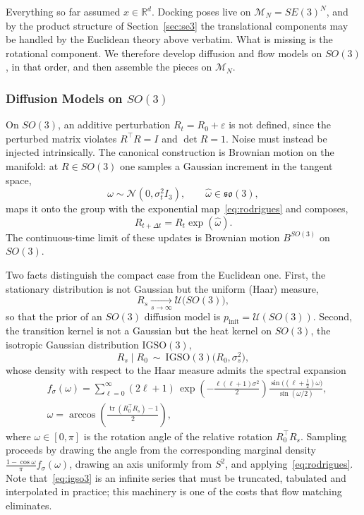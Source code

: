 \documentclass[a4paper,12pt]{article}
\theoremstyle{remark}
\DeclareMathOperator{\tr}{tr}
\begin{document}
Everything so far assumed $x\in\mathbb R^d$. Docking poses live on
$\mathcal M_N=SE(3)^N$, and by the product structure of Section~\ref{sec:se3} the
translational components may be handled by the Euclidean theory above verbatim. What is
missing is the rotational component. We therefore develop diffusion and flow models on
$SO(3)$, in that order, and then assemble the pieces on $\mathcal M_N$.

\subsubsection{Diffusion Models on $SO(3)$}
\label{sec:diff-so3}

On $SO(3)$, an additive perturbation $R_t=R_0+\varepsilon$ is not defined, since the
perturbed matrix violates $R^\top R=I$ and $\det R=1$. Noise must instead be injected
intrinsically. The canonical construction is Brownian motion on the manifold: at
$R\in SO(3)$ one samples a Gaussian increment in the tangent space,
\[
\omega\sim\mathcal N(0,\sigma_t^2I_3),
\qquad
\widehat\omega\in\mathfrak{so}(3),
\]
maps it onto the group with the exponential map~\eqref{eq:rodrigues} and composes,
\[
R_{t+\Delta t}=R_t\exp(\widehat\omega).
\]
The continuous-time limit of these updates is Brownian motion $B^{SO(3)}$ on $SO(3)$.

Two facts distinguish the compact case from the Euclidean one. First, the stationary
distribution is not Gaussian but the uniform (Haar) measure,
\[
R_s\xrightarrow[s\to\infty]{}\mathcal U\bigl(SO(3)\bigr),
\]
so that the prior of an $SO(3)$ diffusion model is $p_{\mathrm{init}}=\mathcal U(SO(3))$.
Second, the transition kernel is not a Gaussian but the heat kernel on $SO(3)$, the
isotropic Gaussian distribution $\mathrm{IGSO}(3)$,
\[
R_s\mid R_0\ \sim\ \mathrm{IGSO}(3)\bigl(R_0,\sigma_s^2\bigr),
\]
whose density with respect to the Haar measure admits the spectral expansion
\begin{align}
\label{eq:igso3}
&f_{\sigma}(\omega)
=
\sum_{\ell=0}^{\infty}
(2\ell+1)\,
\exp\!\left(-\frac{\ell(\ell+1)\sigma^{2}}{2}\right)
\frac{\sin\!\bigl((\ell+\tfrac12)\omega\bigr)}{\sin(\omega/2)},
\\&
\omega
=
\arccos\!\left(\frac{\tr(R_0^\top R_s)-1}{2}\right),
\end{align}
where $\omega\in[0,\pi]$ is the rotation angle of the relative rotation
$R_0^\top R_s$. Sampling proceeds by drawing the angle from the corresponding marginal
density $\tfrac{1-\cos\omega}{\pi}f_\sigma(\omega)$, drawing an axis uniformly from
$S^2$, and applying~\eqref{eq:rodrigues}. Note that~\eqref{eq:igso3} is an infinite
series that must be truncated, tabulated and interpolated in practice; this machinery is
one of the costs that flow matching eliminates.
\end{document}
